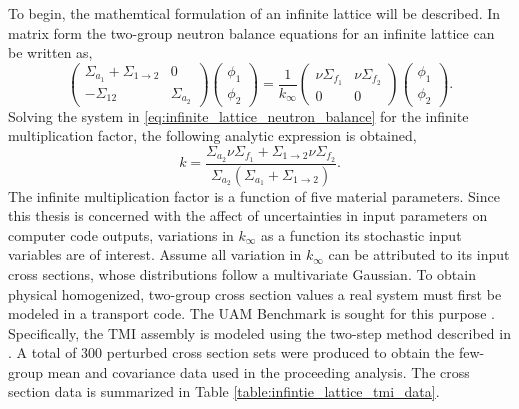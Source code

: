 To begin, the mathemtical formulation of an infinite lattice will be described. In matrix form the two-group neutron balance equations for an infinite lattice can be written as,
\begin{equation}
\label{eq:infinite_lattice_neutron_balance}
   \left(
    \begin{array}{cc}
     \Sigma_{a_1} + \Sigma_{1\rightarrow 2} & 0 \\
     -\Sigma_{12} & \Sigma_{a_2} 
    \end{array}
   \right)
   \left(
    \begin{array}{c}
     \phi_1 \\
     \phi_2
    \end{array}
   \right) 
   = \frac{1}{k_{\infty}}
   \left(
    \begin{array}{cc}
     \nu\Sigma_{f_1} & \nu\Sigma_{f_2} \\
     0 & 0 
    \end{array}
   \right)
   \left(
    \begin{array}{c}
     \phi_1 \\
     \phi_2
    \end{array}
   \right). 
\end{equation}  
Solving the system in \ref{eq:infinite_lattice_neutron_balance} for the infinite multiplication factor, the following analytic expression is obtained,
\begin{equation}
\label{eq:infinite_lattice_kinf}
   k = \frac{\Sigma_{a_2}\nu\Sigma_{f_1} + 
             \Sigma_{1\rightarrow 2}\nu\Sigma_{f_2}}{
              \Sigma_{a_2}\left(
               \Sigma_{a_1} + \Sigma_{1\rightarrow 2}\right)}.
\end{equation}
The infinite multiplication factor is a function of five material parameters. Since this thesis is concerned with the affect of uncertainties in input parameters on computer code outputs, variations in $k_{\infty}$ as a function its stochastic input variables are of interest. Assume all variation in $k_{\infty}$ can be attributed to its input cross sections, whose distributions follow a multivariate Gaussian. To obtain physical homogenized, two-group cross section values a real system must first be modeled in a transport code. The \ac{UAM} Benchmark is sought for this purpose \cite{UAM_Benchmark}. Specifically, the \ac{TMI} assembly is modeled using the two-step method described in \cite{TwoStep_Approach}. A total of 300 perturbed cross section sets were produced to obtain the few-group mean and covariance data used in the proceeding analysis. The cross section data is summarized in Table \ref{table:infintie_lattice_tmi_data}.      
